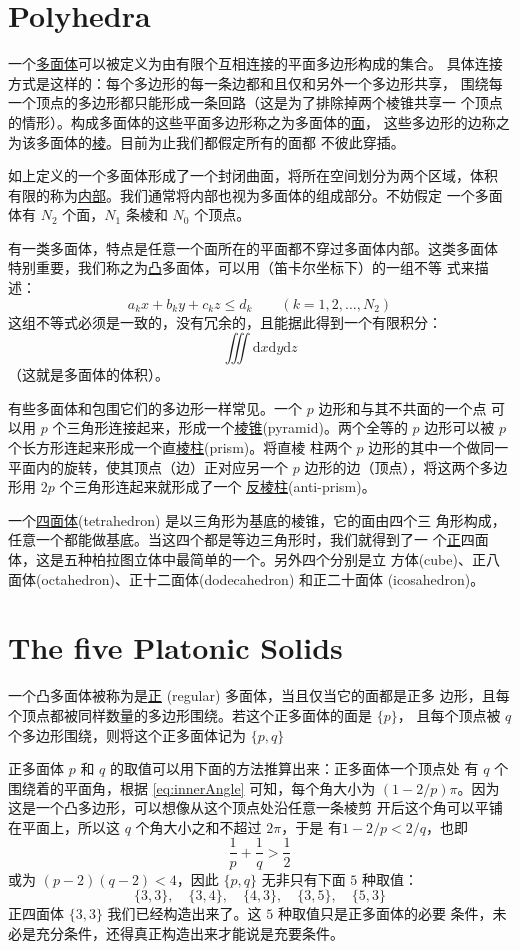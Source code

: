 \documentclass[cs4size,a4paper,adobefonts,openany]{ctexbook}
\newcommand{\pname}[1]{\underline{#1}}
\numberwithin{equation}{section}
\begin{document}
\section{Polyhedra}
一个\pname{多面体}可以被定义为由有限个互相连接的平面多边形构成的集合。
具体连接方式是这样的：每个多边形的每一条边都和且仅和另外一个多边形共享，
围绕每一个顶点的多边形都只能形成一条回路（这是为了排除掉两个棱锥共享一
  个顶点的情形）。构成多面体的这些平面多边形称之为多面体的\pname{面}，
这些多边形的边称之为该多面体的\pname{棱}。目前为止我们都假定所有的面都
不彼此穿插。

如上定义的一个多面体形成了一个封闭曲面，将所在空间划分为两个区域，体积
有限的称为\pname{内部}。我们通常将内部也视为多面体的组成部分。不妨假定
一个多面体有 $N_2$ 个面，$N_1$ 条棱和 $N_0$ 个顶点。

有一类多面体，特点是任意一个面所在的平面都不穿过多面体内部。这类多面体
特别重要，我们称之为\pname{凸}多面体，可以用（笛卡尔坐标下）的一组不等
式来描述：
\[
a_kx+b_ky+c_kz \leq d_k\qquad (k=1,2,\dots,N_2)
\]
这组不等式必须是一致的，没有冗余的，且能据此得到一个有限积分：
\[
\iiint\text{d}x\text{d}y\text{d}z
\]
（这就是多面体的体积）。

有些多面体和包围它们的多边形一样常见。一个 $p$ 边形和与其不共面的一个点
可以用 $p$ 个三角形连接起来，形成一个\pname{棱锥}(pyramid)。两个全等的
$p$ 边形可以被 $p$ 个长方形连起来形成一个直\pname{棱柱}(prism)。将直棱
柱两个 $p$ 边形的其中一个做同一平面内的旋转，使其顶点（边）正对应另一个
$p$ 边形的边（顶点），将这两个多边形用 $2p$ 个三角形连起来就形成了一个
\pname{反棱柱}(anti-prism)。

一个\pname{四面体}(tetrahedron) 是以三角形为基底的棱锥，它的面由四个三
角形构成，任意一个都能做基底。当这四个都是等边三角形时，我们就得到了一
个\pname{正}四面体，这是五种柏拉图立体中最简单的一个。另外四个分别是立
方体(cube)、正八面体(octahedron)、正十二面体(dodecahedron) 和正二十面体
(icosahedron)。

\section{The five Platonic Solids}

一个凸多面体被称为是\pname{正} (regular) 多面体，当且仅当它的面都是正多
边形，且每个顶点都被同样数量的多边形围绕。若这个正多面体的面是 $\{p\}$，
且每个顶点被 $q$ 个多边形围绕，则将这个正多面体记为 $\{p,q\}$

正多面体 $p$ 和 $q$ 的取值可以用下面的方法推算出来：正多面体一个顶点处
有 $q$ 个围绕着的平面角，根据 \eqref{eq:innerAngle} 可知，每个角大小为
$(1-2/p)\pi$。因为这是一个凸多边形，可以想像从这个顶点处沿任意一条棱剪
开后这个角可以平铺在平面上，所以这 $q$ 个角大小之和不超过 $2\pi$，于是
有$1-2/p<2/q$，也即
\begin{equation}
  \label{eq:pqInequal}
  \frac{1}{p}+\frac{1}{q}>\frac{1}{2}
\end{equation}
或为 $(p-2)(q-2)<4$，因此 $\{p,q\}$ 无非只有下面 $5$ 种取值：
\[
\{3,3\},\quad\{3,4\},\quad\{4,3\},\quad\{3,5\},\quad\{5,3\}
\]
正四面体 $\{3,3\}$ 我们已经构造出来了。这 $5$ 种取值只是正多面体的必要
条件，未必是充分条件，还得真正构造出来才能说是充要条件。
\end{document}

